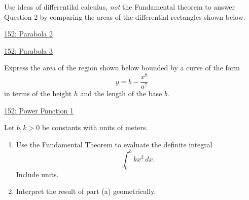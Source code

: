 \documentclass{ximera}
\begin{document}
\begin{question}  \label{Q9erkmbzxee}
Use ideas of differentilal calculus, \emph{not} the Fundamental theorem to answer Question 2 by comparing the areas of the differential rectangles shown below.

\begin{onlineOnly}
    \begin{center}
\end{center}
\end{onlineOnly}

\href{https://www.desmos.com/calculator/pvskgbpnew}{152: Parabola 2}

\begin{onlineOnly}
    \begin{center}
\end{center}
\end{onlineOnly}

\href{https://www.desmos.com/calculator/0w37bixe79}{152: Parabola 3}

\end{question}



\begin{question} \label{QOLDefeefKRerbttp}
Express the area of the region shown below bounded by a curve of the form 
\[
   y=b - \frac{x^8}{a^7}
\]
in terms of the height $h$ and the length of the base $b$.

\begin{onlineOnly}
    \begin{center}
\end{center}
\end{onlineOnly}

\href{https://www.desmos.com/calculator/0mftg33xde}{152: Power Function 1}

\end{question}




\begin{question} \label{QOidfsfer}
Let $b,k>0$ be constants with units of meters.
\begin{enumerate}
\item Use the Fundamental Theorem to evaluate the definite integral
\[
   \int_0^b kx^2\, dx . 
\]
Include units.

\item Interpret the result of part (a) geometrically.
\end{enumerate}

\end{question}
\end{document}
